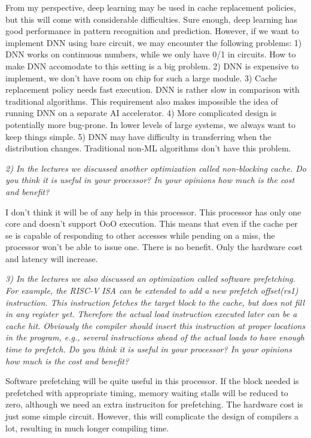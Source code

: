 \documentclass[utf8]{article}
\begin{document}
From my perspective, deep learning may be used in cache replacement policies, but this will come with considerable difficulties. Sure enough, deep learning has good performance in pattern recognition and prediction. However, if we want to implement DNN using bare circuit, we may encounter the following problems: 1) DNN works on continuous numbers, while we only have 0/1 in circuits. How to make DNN accomodate to this setting is a big problem. 2) DNN is expensive to implement, we don't have room on chip for such a large module. 3) Cache replacement policy needs fast execution. DNN is rather slow in comparison with traditional algorithms. This requirement also makes impossible the idea of running DNN on a separate AI accelerator. 4) More complicated design is potentially more bug-prone. In lower levels of large systems, we always want to keep things simple. 5) DNN may have difficulty in transferring when the distribution changes. Traditional non-ML algorithms don't have this problem.
\newline

\noindent
\emph{2) In the lectures we discussed another optimization called non-blocking cache. Do you think it is useful in your processor? In your opinions how much is the cost and benefit?} 

I don't think it will be of any help in this processor. This processor has only one core and doesn't support OoO execution. This means that even if the cache per se is capable of responding to other accesses while pending on a miss, the processor won't be able to issue one. There is no benefit. Only the hardware cost and latency will increase.
\newline

\noindent
\emph{3) In the lectures we also discussed an optimization called software prefetching. For example,
	the RISC-V ISA can be extended to add a new prefetch offset(rs1) instruction. This
	instruction fetches the target block to the cache, but does not fill in any register yet.
	Therefore the actual load instruction executed later can be a cache hit. Obviously the
	compiler should insert this instruction at proper locations in the program, e.g., several
	instructions ahead of the actual loads to have enough time to prefetch. Do you think it is
	useful in your processor? In your opinions how much is the cost and benefit?}

Software prefetching will be quite useful in this processor. If the block needed is prefetched with appropriate timing, memory waiting stalls will be reduced to zero, although we need an extra instruciton for prefetching. The hardware cost is just some simple circuit. However, this will complicate the design of compilers a lot, resulting in much longer compiling time.
\end{document}
